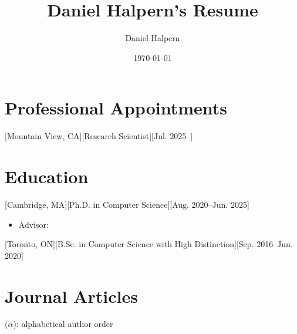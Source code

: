 \documentclass{article}
\title{Daniel Halpern's Resume}
\author{Daniel Halpern}
\date{\today}
\newcommand{\link}[2]{\iftoggle{uselinks}{\href{#1}{#2}}{#2}\xspace}
\begin{document}

    \makecvtitle %

    \section{Professional Appointments}

    [Mountain View, CA][Research Scientist][Jul. 2025--]


    \section{Education}

    [Cambridge, MA][Ph.D. in Computer Science][Aug. 2020--Jun. 2025]
\begin{itemize}
    \item Advisor: \link{http://procaccia.info}{Ariel D. Procaccia}
\end{itemize}

    [Toronto, ON][B.Sc. in Computer Science with High Distinction][Sep. 2016--Jun. 2020]

    
    
	\section{Journal Articles}
    
    \renewcommand{\labelenumi}{J\theenumi.}
    {\footnotesize($\alpha$): alphabetical author order}
    \begin{etaremune}
    [itemsep=0.2ex,
        leftmargin=4.8ex]
        
    \end{etaremune}
\end{document}
